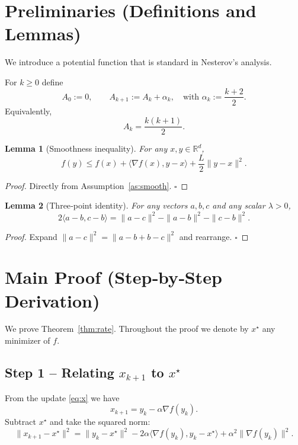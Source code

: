 \documentclass{article}
\newtheorem{lemma}{Lemma}
\newcommand{\R}{\mathbb{R}}
\begin{document}
\section*{Preliminaries (Definitions and Lemmas)}
We introduce a potential function that is standard in Nesterov’s analysis.

\begin{definition}
For \(k\ge 0\) define
\[
A_0:=0,\qquad A_{k+1}:=A_k+\alpha_k,\quad\text{with }\alpha_k:=\frac{k+2}{2}.
\tag{D1}
\]
Equivalently,
\[
A_k=\frac{k(k+1)}{2}.
\]
\end{definition}

\begin{lemma}[Smoothness inequality]\label{lem:smooth}
For any \(x,y\in\R^d\),
\[
f(y)\le f(x)+\langle\nabla f(x),y-x\rangle+\frac{L}{2}\|y-x\|^2 .
\tag{L1}
\]
\end{lemma}
\begin{proof}
Directly from Assumption~\ref{as:smooth}. \hfill\(\square\)
\end{proof}

\begin{lemma}[Three‑point identity]\label{lem:three}
For any vectors \(a,b,c\) and any scalar \(\lambda>0\),
\[
2\langle a-b,c-b\rangle = \|a-c\|^{2}-\|a-b\|^{2}-\|c-b\|^{2}.
\tag{L2}
\]
\end{lemma}
\begin{proof}
Expand \(\|a-c\|^2 = \|a-b + b-c\|^2\) and rearrange. \hfill\(\square\)
\end{proof}

\section*{Main Proof (Step‑by‑Step Derivation)}
We prove Theorem~\ref{thm:rate}. Throughout the proof we denote by \(x^\star\) any minimizer of \(f\).

\subsection*{Step 1 – Relating \(x_{k+1}\) to \(x^\star\)}
From the update \eqref{eq:x} we have
\[
x_{k+1}=y_k-\alpha\nabla f(y_k).
\]
Subtract \(x^\star\) and take the squared norm:
\[
\|x_{k+1}-x^\star\|^{2}
 =\|y_k-x^\star\|^{2}
 -2\alpha\langle\nabla f(y_k),y_k-x^\star\rangle
 +\alpha^{2}\|\nabla f(y_k)\|^{2}.
\tag{S1}
\]
\end{document}
